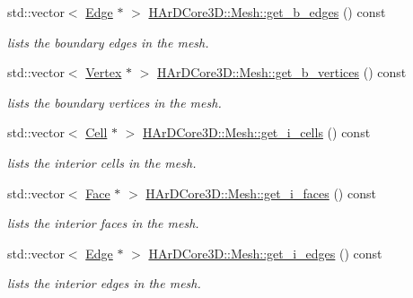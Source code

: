 \begin{DoxyCompactItemize}
std\+::vector$<$ \hyperlink{classHArDCore3D_1_1Edge}{Edge} $\ast$ $>$ \hyperlink{group__Mesh_gaab118708826029e78cab33759480457d}{H\+Ar\+D\+Core3\+D\+::\+Mesh\+::get\+\_\+b\+\_\+edges} () const
\begin{DoxyCompactList}\small\item\em lists the boundary edges in the mesh. \end{DoxyCompactList}\item 
\mbox{\label{group__Mesh_ga41f26cc7aaf8946a13b3f2c1700c8e63}} 
std\+::vector$<$ \hyperlink{classHArDCore3D_1_1Vertex}{Vertex} $\ast$ $>$ \hyperlink{group__Mesh_ga41f26cc7aaf8946a13b3f2c1700c8e63}{H\+Ar\+D\+Core3\+D\+::\+Mesh\+::get\+\_\+b\+\_\+vertices} () const
\begin{DoxyCompactList}\small\item\em lists the boundary vertices in the mesh. \end{DoxyCompactList}\item 
\mbox{\label{group__Mesh_ga7b88870d7da98e3c1762ea5e2921a0de}} 
std\+::vector$<$ \hyperlink{classHArDCore3D_1_1Cell}{Cell} $\ast$ $>$ \hyperlink{group__Mesh_ga7b88870d7da98e3c1762ea5e2921a0de}{H\+Ar\+D\+Core3\+D\+::\+Mesh\+::get\+\_\+i\+\_\+cells} () const
\begin{DoxyCompactList}\small\item\em lists the interior cells in the mesh. \end{DoxyCompactList}\item 
\mbox{\label{group__Mesh_ga3ec5d24146948a627e100e838de0f715}} 
std\+::vector$<$ \hyperlink{classHArDCore3D_1_1Face}{Face} $\ast$ $>$ \hyperlink{group__Mesh_ga3ec5d24146948a627e100e838de0f715}{H\+Ar\+D\+Core3\+D\+::\+Mesh\+::get\+\_\+i\+\_\+faces} () const
\begin{DoxyCompactList}\small\item\em lists the interior faces in the mesh. \end{DoxyCompactList}\item 
\mbox{\label{group__Mesh_gab47e764fd3660ad3b910d203a57ebfe3}} 
std\+::vector$<$ \hyperlink{classHArDCore3D_1_1Edge}{Edge} $\ast$ $>$ \hyperlink{group__Mesh_gab47e764fd3660ad3b910d203a57ebfe3}{H\+Ar\+D\+Core3\+D\+::\+Mesh\+::get\+\_\+i\+\_\+edges} () const
\begin{DoxyCompactList}\small\item\em lists the interior edges in the mesh. \end{DoxyCompactList}\item 

\end{DoxyCompactItemize}
